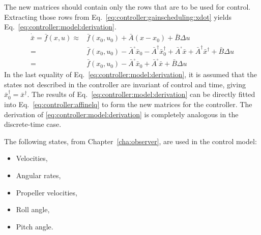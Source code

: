     The new matrices should contain only the rows that are to be used
    for control. Extracting those rows from Eq.~\eqref{eq:controller:gainscheduling:xdot}
    yields Eq.~\eqref{eq:controller:model:derivation}.
    \begin{equation}
        \label{eq:controller:model:derivation}
        \begin{array}{rl}
             \dot{\bar{x}} = \bar{f}(x,u) \approx & \bar{f}(x_{0},u_{0}) + \bar{A}(x - x_{0}) + \bar{B}\Delta u \\
             = & \bar{f}(x_{0},u_{0}) - \bar{A}^{\square}\bar{x}_{0} - \bar{A}^{\dagger}\bar{x}^{\dagger}_{0} + \bar{A}^{\square}\bar{x} + \bar{A}^{\dagger}\bar{x}^{\dagger} + \bar{B}\Delta u \\
             = & \bar{f}(x_{0},u_{0}) - \bar{A}^{\square}\bar{x}_{0} + \bar{A}^{\square}\bar{x} + \bar{B}\Delta u
        \end{array}
    \end{equation}
    In the last equality of Eq.~\eqref{eq:controller:model:derivation}, it
    is assumed that the states not described in the controller are invariant
    of control and time, giving $\bar{x}^{\dagger}_{0} = \bar{x}^{\dagger}$.
    The results of Eq.~\eqref{eq:controller:model:derivation} can be
    directly fitted into Eq.~\eqref{eq:controller:affinelq} to form
    the new matrices for the controller.
    The derivation of \eqref{eq:controller:model:derivation} is
    completely analogous in the discrete-time case.

    The following states, from Chapter~\ref{cha:observer}, are used in the control model:
    \begin{itemize}
        \item Velocities,
        \item Angular rates,
        \item Propeller velocities,
        \item Roll angle,
        \item Pitch angle.
    \end{itemize}
